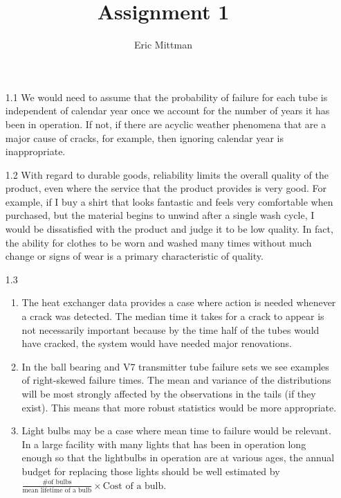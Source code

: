 \documentclass[12pt]{article}\usepackage[]{graphicx}\usepackage[]{color}
\author{Eric Mittman}
\title{Assignment 1}
\begin{document}
\maketitle
\begin{enumerate}
  \item[1.1]
  We would need to assume that the probability of failure for each tube is independent of calendar year once we account for the number of years it has been in operation. If not, if there are acyclic weather phenomena that are a major cause of cracks, for example, then ignoring calendar year is inappropriate.
  
  \item[1.2]
  With regard to durable goods, reliability limits the overall quality of the product, even where the service that the product provides is very good. For example, if I buy a shirt that looks fantastic and feels very comfortable when purchased, but the material begins to unwind after a single wash cycle, I would be dissatisfied with the product and judge it to be low quality. In fact, the ability for clothes to be worn and washed many times without much change or signs of wear is a primary characteristic of quality.
  
  \item[1.3]
  
  \begin{enumerate}
    \item
    The heat exchanger data provides a case where action is needed whenever a crack was detected. The median time it takes for a crack to appear is not necessarily important because by the time half of the tubes would have cracked, the system would have needed major renovations. 
    
    \item
    In the ball bearing and V7 transmitter tube failure sets we see examples of right-skewed failure times. The mean and variance of the distributions will be most strongly affected by the observations in the tails (if they exist). This means that more robust statistics would be more appropriate.
    
    \item
    Light bulbs may be a case where mean time to failure would be relevant. In a large facility with many lights that has been in operation long enough so that the lightbulbs in operation are at various ages, the annual budget for replacing those lights should be well estimated by $\frac{\text{\# of bulbs}}{\text{mean lifetime of a bulb}}\times \text{Cost of a bulb}$.
    

\end{enumerate}
\end{enumerate}
\end{document}
